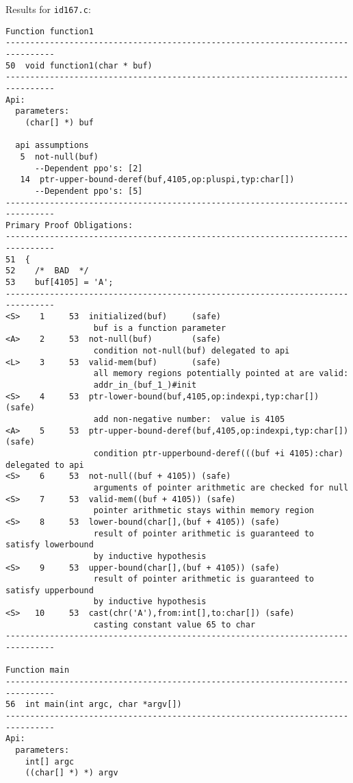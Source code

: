 \documentclass[11pt]{article}
\begin{document}
Results for {\tt id167.c}:
\begin{scriptsize}
\begin{verbatim}
Function function1
--------------------------------------------------------------------------------
50  void function1(char * buf)
--------------------------------------------------------------------------------
Api:
  parameters:
    (char[] *) buf

  api assumptions
   5  not-null(buf)
      --Dependent ppo's: [2]
   14  ptr-upper-bound-deref(buf,4105,op:pluspi,typ:char[])
      --Dependent ppo's: [5]
--------------------------------------------------------------------------------
Primary Proof Obligations:
--------------------------------------------------------------------------------
51  {
52    /*  BAD  */
53    buf[4105] = 'A';
--------------------------------------------------------------------------------
<S>    1     53  initialized(buf)     (safe)
                  buf is a function parameter
<A>    2     53  not-null(buf)        (safe)
                  condition not-null(buf) delegated to api
<L>    3     53  valid-mem(buf)       (safe)
                  all memory regions potentially pointed at are valid: 
                  addr_in_(buf_1_)#init
<S>    4     53  ptr-lower-bound(buf,4105,op:indexpi,typ:char[]) (safe)
                  add non-negative number:  value is 4105
<A>    5     53  ptr-upper-bound-deref(buf,4105,op:indexpi,typ:char[]) (safe)
                  condition ptr-upperbound-deref(((buf +i 4105):char) delegated to api
<S>    6     53  not-null((buf + 4105)) (safe)
                  arguments of pointer arithmetic are checked for null
<S>    7     53  valid-mem((buf + 4105)) (safe)
                  pointer arithmetic stays within memory region
<S>    8     53  lower-bound(char[],(buf + 4105)) (safe)
                  result of pointer arithmetic is guaranteed to satisfy lowerbound 
                  by inductive hypothesis
<S>    9     53  upper-bound(char[],(buf + 4105)) (safe)
                  result of pointer arithmetic is guaranteed to satisfy upperbound 
                  by inductive hypothesis
<S>   10     53  cast(chr('A'),from:int[],to:char[]) (safe)
                  casting constant value 65 to char
--------------------------------------------------------------------------------

Function main
--------------------------------------------------------------------------------
56  int main(int argc, char *argv[])
--------------------------------------------------------------------------------
Api:
  parameters:
    int[] argc
    ((char[] *) *) argv


\end{verbatim}
\end{scriptsize}
\end{document}
